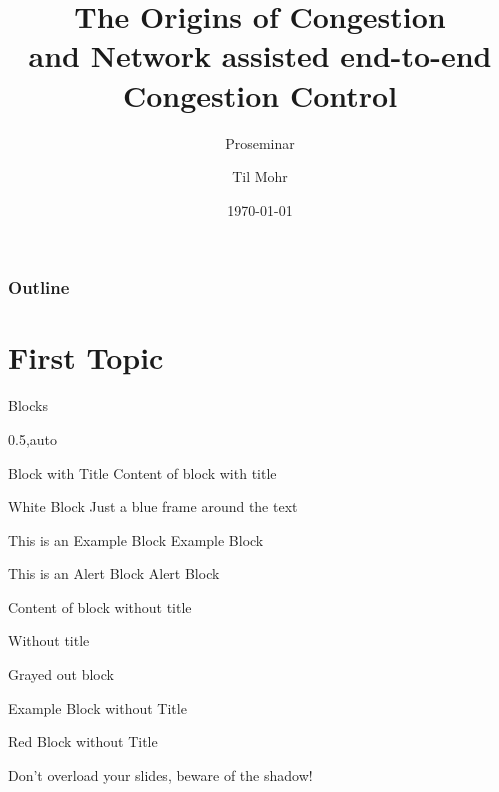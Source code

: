 \documentclass[english,aspectratio=43,t]{beamer}
\title[Cool]{The Origins of Congestion\\and Network assisted end-to-end\\Congestion Control}
\author{Til Mohr}
\subtitle{Proseminar}
\date{\today}
\begin{document}
\titleframe


\begin{frame}
	\frametitle{Outline}
	\tableofcontents
\end{frame}


\section{First Topic}
\label{sec:first_topic}
\frame\sectionpage


\begin{frame}{Blocks}
	\begin{cols}{0.5,auto}
		\begin{block}{Block with Title}
			Content of block with title
		\end{block}
		\begin{whiteblock}{White Block}
			Just a blue frame around the text
		\end{whiteblock}
		\begin{exampleblock}{This is an Example Block}
			Example Block
		\end{exampleblock}
		\begin{alertblock}{This is an Alert Block}
			Alert Block
		\end{alertblock}
	\col
		\begin{block}{}
			Content of block without title
		\end{block}
		\begin{whiteblock}{}
			Without title
		\end{whiteblock}
		\begin{grayblock}{}
			Grayed out block
		\end{grayblock}
		\begin{exampleblock}{}
			Example Block without Title
		\end{exampleblock}
		\begin{redblock}{}
			Red Block without Title
		\end{redblock}
	\end{cols}
	\pushdown
	\begin{alertblock}{}
		\begin{center}Don't overload your slides, beware of the shadow!\end{center}
	\end{alertblock}
\end{frame}
\end{document}
